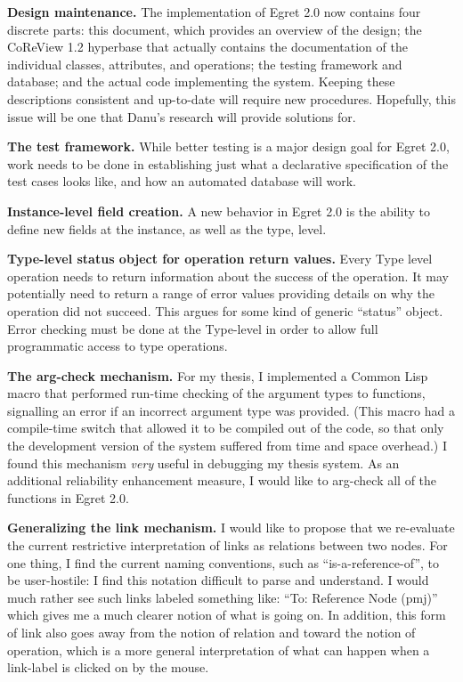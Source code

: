 \begin{itemizenoindent}

\item {\bf Design maintenance.}  The implementation of Egret 2.0 now 
contains four discrete parts:  this document, which provides an overview
of the design; the CoReView 1.2 hyperbase that actually contains the 
documentation of the individual classes, attributes, and operations; 
the testing framework and database; and the actual code implementing the system.
Keeping these descriptions consistent and up-to-date will require new
procedures.  Hopefully, this issue will be one that Danu's research will 
provide solutions for.

\item {\bf The test framework.}  While better testing is a major design
goal for Egret 2.0, work needs to be done in establishing just what a 
declarative specification of the test cases looks like, and how an 
automated database will work.

\item {\bf Instance-level field creation.}  A new behavior in Egret 2.0
is the ability to define new fields at the instance, as well as the type,
level.

\item {\bf Type-level status object for operation return values.}
Every Type level operation needs to return information about the 
success of the operation.  It may potentially need to return a range 
of error values providing details on why the operation did not succeed.
This argues for some kind of generic ``status'' object.  Error checking
must be done at the Type-level in order to allow full programmatic
access to type operations.

\item {\bf The arg-check mechanism.}  For my thesis, I implemented a 
Common Lisp macro that performed run-time checking of the argument
types to functions, signalling an error if an incorrect argument type
was provided. (This macro had a compile-time switch that allowed it to
be compiled out of the code, so that only the development version of
the system suffered from time and space overhead.) I found this
mechanism {\em very}\/ useful in debugging my thesis system. As an
additional reliability enhancement measure, I would like to arg-check
all of the functions in Egret 2.0.

\item {\bf Generalizing the link mechanism.}  I would like to propose that
we re-evaluate the current restrictive interpretation of links as
relations between two nodes.  For one thing, I find the current naming
conventions, such as ``is-a-reference-of'', to be user-hostile: I
find this notation difficult to parse and understand.  I would much
rather see such links labeled something like: ``To: Reference Node
(pmj)'' which gives me a much clearer notion of what is going on.  In
addition, this form of link also goes away from the notion of relation
and toward the notion of operation, which is a more general
interpretation of what can happen when a link-label is clicked on by
the mouse.


\end{itemizenoindent}
